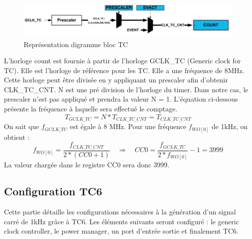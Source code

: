 \documentclass[a4paper]{article}
\begin{document}
	\begin{figure}[H]
		\centering
		\includegraphics[width=12cm]{prescaler.jpg}
		\caption{Représentation digramme bloc TC}
	\end{figure}
	
	L'horloge count est fournie à partir de l’horloge GCLK\_TC (Generic clock for TC). Elle est l'horloge de référence pour les TC. Elle a une fréquence de 8MHz. Cette horloge peut être divisée en y appliquant un prescaler afin d’obtenir CLK\_TC\_CNT. N est une pré division de l’horloge du timer. Dans notre cas, le prescaler n’est pas appliqué et prendra la valeur N = 1. L'équation ci-dessous présente la fréquence à laquelle sera effectué le comptage. \\
	\begin{equation}
		T_{GCLK\_TC} = N*T_{CLK\_TC\_CNT} = T_{CLK\_TC\_CNT}
	\end{equation}
	On sait que $f_{GCLK\_TC}$ est égale à 8 MHz. Pour une fréquence $f_{WO[0]}$ de 1kHz, on obtient :
	\begin{equation}
		f_{WO[0]} = \frac{f_{CLK\_TC\_CNT}}{2*(CC0+1)}
		\quad \Rightarrow \quad 
		CC0 = \frac{f_{GCLK\_TC}}{2*f_{WO[0]}} - 1 = 3999
	\end{equation}
	La valeur chargée dans le registre CC0 sera donc 3999.
	
	\subsection{Configuration TC6}
	Cette partie détaille les configurations nécessaires à la génération d'un signal carré de 1kHz grâce à TC6. Les éléments suivants seront configuré : le generic clock controller, le power manager, un port d'entrée sortie et finalement TC6.
\end{document}

